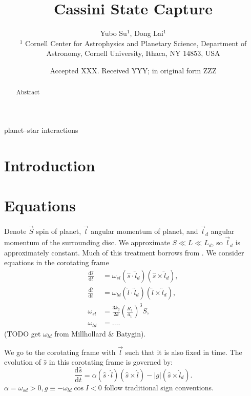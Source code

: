 \documentclass[
        fleqn,
        usenatbib,
    ]{mnras}
\title[Cassini State Capture]{Cassini State Capture}
\author[Y. Su et\ al.]{
Yubo Su$^1$,
Dong Lai$^1$
\\
$^1$ Cornell Center for Astrophysics and Planetary Science, Department of
Astronomy, Cornell University, Ithaca, NY 14853, USA
}
\date{Accepted XXX\@. Received YYY\@; in original form ZZZ}
\newcommand*{\rd}[2]{\frac{\mathrm{d}#1}{\mathrm{d}#2}}
\newcommand*{\abs}[1]{\left|#1\right|}
\newcommand*{\p}[1]{\left(#1\right)}
\begin{document}
\label{firstpage}
\pagerange{\pageref{firstpage}--\pageref{lastpage}}
\renewcommand*{\sectionautorefname}{Section}
\maketitle


\begin{abstract}
    Abstract
\end{abstract}

\begin{keywords}
planet--star interactions %
\end{keywords}

\section{Introduction}

\section{Equations}\label{s:eq}

Denote $\vec{S}$ spin of planet, $\vec{l}$ angular momentum of planet, and
$\vec{l}_d$ angular momentum of the surrounding disc. We approximate $S \ll L
\ll L_d$, so $\vec{l}_d$ is approximately constant. Much of this treatment
borrows from \citep{anderson2018teeter}. We consider equations in the corotating
frame
\begin{align}
    \rd{\hat{s}}{t} &= \omega_{sl} \p{\hat{s} \cdot \hat{l}_d}
        \p{\hat{s} \times \hat{l}_d},\\
    \rd{\hat{l}}{t} &= \omega_{ld}\p{\hat{l} \cdot \hat{l}_d}
        \p{\hat{l} \times \hat{l}_d},\\
    \omega_{sl} &= \frac{3k_q}{2k}\p{\frac{R_1}{a_1}}^3S,\\
    \omega_{ld} &= \dots.
\end{align}
(TODO get $\omega_{ld}$ from Millhollard \& Batygin).

We go to the corotating frame with $\vec{l}$ such that it is also fixed in time.
The evolution of $\hat{s}$ in this corotating frame is governed by:
\begin{equation}
    \rd{\hat{s}}{t} = \alpha \p{\hat{s} \cdot \hat{l}}
            \p{\hat{s} \times \hat{l}}
        - \abs{g}\p{\hat{s} \times \hat{l}_d}.
        \label{eq:dsdt_base}
\end{equation}
$\alpha = \omega_{sd} > 0, g \equiv -\omega_{ld}\cos I < 0$ follow traditional
sign conventions.
\end{document}
